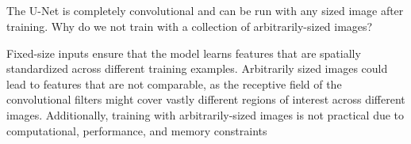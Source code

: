 \documentclass[12pt]{report}
\begin{document}
\subsection{}
\begin{mdframed}
    The U-Net is completely convolutional and can be run with any sized image after training. Why do we not train with a collection of arbitrarily-sized images?
\end{mdframed}

Fixed-size inputs ensure that the model learns features that are spatially standardized across different training examples. Arbitrarily sized images could lead to features that are not comparable, as the receptive field of the convolutional filters might cover vastly different regions of interest across different images. Additionally, training with arbitrarily-sized images is not practical due to computational, performance, and memory constraints
\end{document}
